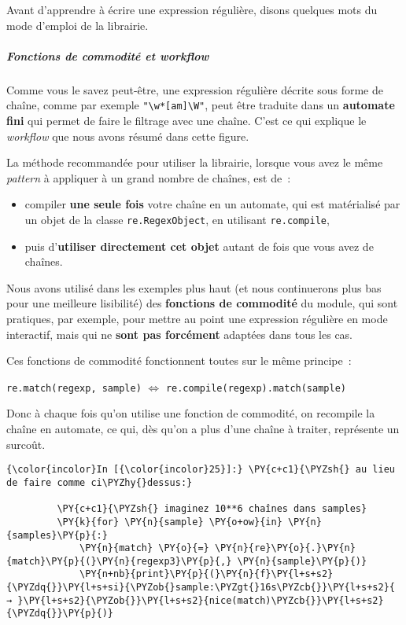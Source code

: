     Avant d'apprendre à écrire une expression régulière, disons quelques
mots du mode d'emploi de la librairie.

    \hypertarget{fonctions-de-commodituxe9-et-workflow}{%
\subparagraph{\texorpdfstring{Fonctions de commodité et
\emph{workflow}}{Fonctions de commodité et workflow}}\label{fonctions-de-commodituxe9-et-workflow}}

    Comme vous le savez peut-être, une expression régulière décrite sous
forme de chaîne, comme par exemple
\texttt{"\textbackslash{}w*{[}am{]}\textbackslash{}W"}, peut être
traduite dans un \textbf{automate fini} qui permet de faire le filtrage
avec une chaîne. C'est ce qui explique le \emph{workflow} que nous avons
résumé dans cette figure.

    La méthode recommandée pour utiliser la librairie, lorsque vous avez le
même \emph{pattern} à appliquer à un grand nombre de chaînes, est de~:

\begin{itemize}
\tightlist
\item
  compiler \textbf{une seule fois} votre chaîne en un automate, qui est
  matérialisé par un objet de la classe \texttt{re.RegexObject}, en
  utilisant \texttt{re.compile},
\item
  puis d'\textbf{utiliser directement cet objet} autant de fois que vous
  avez de chaînes.
\end{itemize}

    Nous avons utilisé dans les exemples plus haut (et nous continuerons
plus bas pour une meilleure lisibilité) des \textbf{fonctions de
commodité} du module, qui sont pratiques, par exemple, pour mettre au
point une expression régulière en mode interactif, mais qui ne
\textbf{sont pas forcément} adaptées dans tous les cas.

Ces fonctions de commodité fonctionnent toutes sur le même principe~:

\texttt{re.match(regexp,\ sample)} \(\Longleftrightarrow\)
\texttt{re.compile(regexp).match(sample)}

Donc à chaque fois qu'on utilise une fonction de commodité, on recompile
la chaîne en automate, ce qui, dès qu'on a plus d'une chaîne à traiter,
représente un surcoût.

    \begin{Verbatim}[commandchars=\\\{\},frame=single,framerule=0.3mm,rulecolor=\color{cellframecolor}]
{\color{incolor}In [{\color{incolor}25}]:} \PY{c+c1}{\PYZsh{} au lieu de faire comme ci\PYZhy{}dessus:}
         
         \PY{c+c1}{\PYZsh{} imaginez 10**6 chaînes dans samples}
         \PY{k}{for} \PY{n}{sample} \PY{o+ow}{in} \PY{n}{samples}\PY{p}{:}
             \PY{n}{match} \PY{o}{=} \PY{n}{re}\PY{o}{.}\PY{n}{match}\PY{p}{(}\PY{n}{regexp3}\PY{p}{,} \PY{n}{sample}\PY{p}{)}
             \PY{n+nb}{print}\PY{p}{(}\PY{n}{f}\PY{l+s+s2}{\PYZdq{}}\PY{l+s+si}{\PYZob{}sample:\PYZgt{}16s\PYZcb{}}\PY{l+s+s2}{ → }\PY{l+s+s2}{\PYZob{}}\PY{l+s+s2}{nice(match)\PYZcb{}}\PY{l+s+s2}{\PYZdq{}}\PY{p}{)}
\end{Verbatim}


